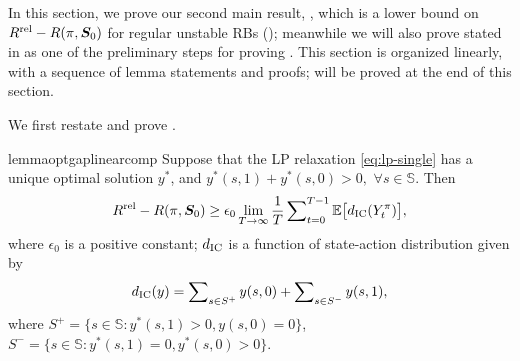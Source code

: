 \documentclass[11pt,letterpaper]{article}
\theoremstyle{plain}
\theoremstyle{definition}
\theoremstyle{remark}
\newcommand{\Ebig}[1]{\mathbb{E}\big[#1\big]}
\newcommand{\ve}[1]{\bm{#1}}
\newcommand{\veS}{\ve{S}}
\newcommand{\sspa}{\mathbb{S}}
\newcommand{\rel}{\textup{rel}} %
\newcommand{\ravg}{R}
\newcommand{\rsysn}{\ravg(\pi, \veS_0)}
\newcommand{\rrel}{\ravg^\rel}
\newcommand{\rewardgap}{\epsilon_0}
\newcommand{\disy}{d_{\textup{IC}}}
\begin{document}
In this section, we prove our second main result, , which is a lower bound on $\rrel - \rsysn$ for regular unstable RBs (); meanwhile we will also prove  stated in  as one of the preliminary steps for proving . 
This section is organized linearly, with a sequence of lemma statements and proofs;  will be proved at the end of this section. 


We first restate and prove . 


\begin{restatable}{lemma}{optgaplinearcomp}\label{lem:opt-gap-linear-comp}
   Suppose that the LP relaxation \eqref{eq:lp-single} has a unique optimal solution $y^*$, and $y^*(s,1) + y^*(s,0) > 0,$ $\forall s\in\sspa$. Then 
   \vspace{-8pt}
    \begin{equation}
        \rrel - \rsysn \geq \rewardgap \lim_{T\to\infty} \frac{1}{T} \sum\nolimits_{t=0}^{T-1} \Ebig{\disy(Y_t^{\pi})},
    \end{equation}
    where $\rewardgap$ is a positive constant; $\disy$ is a function of state-action distribution given by 
    \[
        \disy(y) = \sum\nolimits_{s\in S^+} y(s,0)+ \sum\nolimits_{s\in S^-}y(s,1),
    \]
    where $S^+ = \{s\in\sspa\colon y^*(s,1) > 0, y(s,0) = 0\}$, $S^- = \{s\in\sspa\colon y^*(s,1) = 0, y^*(s,0) > 0\}$. 
\end{restatable}
\end{document}
